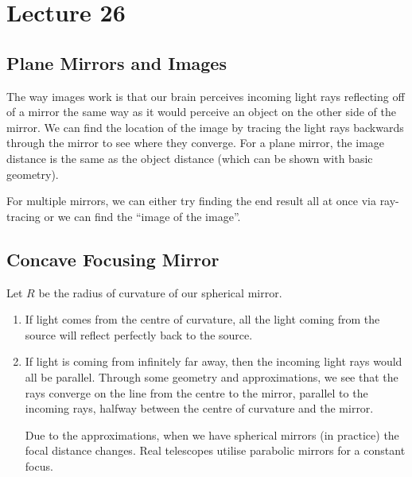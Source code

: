 \documentclass[class=article, crop=false]{standalone}
\begin{document}
  \section{Lecture 26}
  \subsection{Plane Mirrors and Images}
  The way images work is that our brain perceives incoming light rays reflecting off of a mirror the same way as it would perceive an object on the other side of the mirror. We can find the location of the image by tracing the light rays backwards through the mirror to see where they converge. For a plane mirror, the image distance is the same as the object distance (which can be shown with basic geometry). \par
  For multiple mirrors, we can either try finding the end result all at once via ray-tracing or we can find the ``image of the image''.
  \subsection{Concave Focusing Mirror}
  Let $R$ be the radius of curvature of our spherical mirror.
  \begin{enumerate}
    \item If light comes from the centre of curvature, all the light coming from the source will reflect perfectly back to the source.
    \item If light is coming from infinitely far away, then the incoming light rays would all be parallel. Through some geometry and approximations, we see that the rays converge on the line from the centre to the mirror, parallel to the incoming rays, halfway between the centre of curvature and the mirror.
    \begin{note}{}
      Due to the approximations, when we have spherical mirrors (in practice) the focal distance changes. Real telescopes utilise parabolic mirrors for a constant focus.
    \end{note}
  \end{enumerate}
\end{document}
